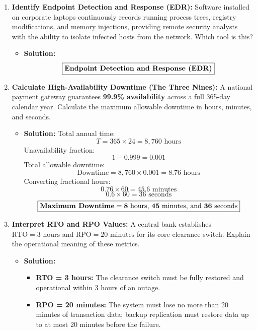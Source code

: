 \begin{enumerate}[label=\textbf{Problem \arabic*.,resume},leftmargin=1.5cm]
\item \textbf{Identify Endpoint Detection and Response (EDR):}
Software installed on corporate laptops continuously records running process trees, registry modifications, and memory injections, providing remote security analysts with the ability to isolate infected hosts from the network. Which tool is this?
\begin{itemize}
\item \textbf{Solution:}
\[ \boxed{\text{\textbf{Endpoint Detection and Response (EDR)}}} \]
\end{itemize}

\item \textbf{Calculate High-Availability Downtime (The Three Nines):}
A national payment gateway guarantees \textbf{99.9\% availability} across a full 365-day calendar year. Calculate the maximum allowable downtime in hours, minutes, and seconds.
\begin{itemize}
\item \textbf{Solution:}
Total annual time:
\[ T = 365 \times 24 = 8,760\text{ hours} \]
Unavailability fraction:
\[ 1 - 0.999 = 0.001 \]
Total allowable downtime:
\[ \text{Downtime} = 8,760 \times 0.001 = 8.76\text{ hours} \]
Converting fractional hours:
\[ 0.76 \times 60 = 45.6\text{ minutes} \]
\[ 0.6 \times 60 = 36\text{ seconds} \]
\[ \boxed{\text{\textbf{Maximum Downtime}} = \mathbf{8\text{ hours, } 45\text{ minutes, and } 36\text{ seconds}}} \]
\end{itemize}

\item \textbf{Interpret RTO and RPO Values:}
A central bank establishes $\text{RTO} = 3\text{ hours}$ and $\text{RPO} = 20\text{ minutes}$ for its core clearance switch. Explain the operational meaning of these metrics.
\begin{itemize}
\item \textbf{Solution:}
\begin{itemize}
\item \textbf{RTO = 3 hours:} The clearance switch must be fully restored and operational within 3 hours of an outage.
\item \textbf{RPO = 20 minutes:} The system must lose no more than 20 minutes of transaction data; backup replication must restore data up to at most 20 minutes before the failure.
\end{itemize}
\end{itemize}


\end{enumerate}
